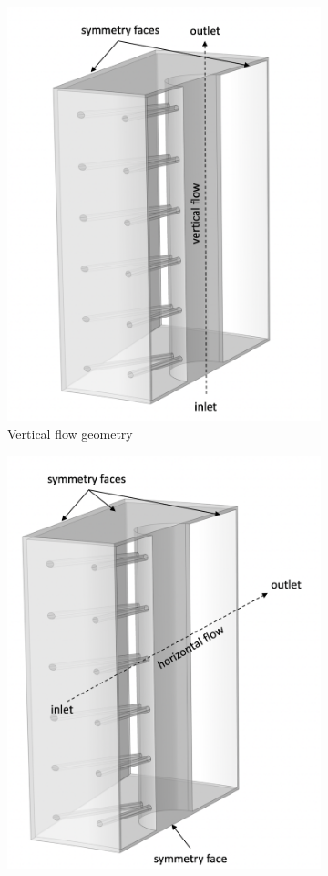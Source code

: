 \begin{figure}[!htb]
\centering
\begin{subfigure}{.49\textwidth}
  \centering
  \includegraphics[width=0.85\linewidth]{figs/vertical.png}
  \caption{Vertical flow geometry}
  \label{fig:vertical}
\end{subfigure}
\begin{subfigure}{.49\textwidth}
  \centering
  \includegraphics[width=0.85\linewidth]{figs/horizontal.png}

\end{subfigure}
\end{figure}
